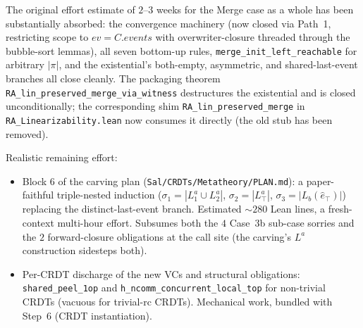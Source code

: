 \documentclass[11pt,a4paper]{article}
\theoremstyle{definition}
\theoremstyle{remark}
\newcommand{\ev}{\mathit{ev}}
\begin{document}
The original effort estimate of $2$--$3$ weeks for the Merge case as
a whole has been substantially absorbed: the convergence machinery
(now closed via Path~1, restricting scope to $\ev = C.\mathit{events}$
with overwriter-closure threaded through the bubble-sort lemmas), all
seven bottom-up rules, \texttt{merge\_init\_left\_reachable} for
arbitrary $|\pi|$, and the existential's both-empty,
asymmetric, and shared-last-event branches all close cleanly.
The packaging theorem
\texttt{RA\_lin\_preserved\_merge\_via\_witness} destructures the
existential and is closed unconditionally; the corresponding shim
\texttt{RA\_lin\_preserved\_merge} in
\texttt{RA\_Linearizability.lean} now consumes it directly (the
old stub has been removed).

Realistic remaining effort:
\begin{itemize}[leftmargin=*]
  \item Block 6 of the carving plan (\texttt{Sal/CRDTs/Metatheory/PLAN.md}):
    a paper-faithful triple-nested induction
    ($\sigma_1 = |L_1^a \cup L_2^a|$, $\sigma_2 = |L_\top^a|$,
    $\sigma_3 = |L_b(\hat e_\top)|$) replacing the
    distinct-last-event branch. Estimated $\sim 280$ Lean lines, a
    fresh-context multi-hour effort. Subsumes both the $4$
    Case~3b sub-case sorries and the $2$ forward-closure
    obligations at the call site (the carving's $L^a$
    construction sidesteps both).
  \item Per-CRDT discharge of the new VCs and structural
    obligations: \texttt{shared\_peel\_1op} and
    \texttt{h\_ncomm\_concurrent\_local\_top} for non-trivial
    CRDTs (vacuous for trivial-rc CRDTs). Mechanical work,
    bundled with Step~6 (CRDT instantiation).
\end{itemize}
\end{document}
